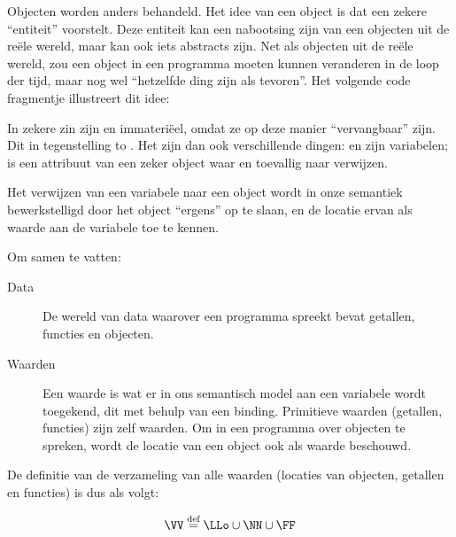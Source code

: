 Objecten worden anders behandeld. Het idee van een object is dat een zekere ``entiteit'' voorstelt. Deze entiteit kan een nabootsing zijn van een objecten uit de reële wereld, maar kan ook iets abstracts zijn. Net als objecten uit de reële wereld, zou een object in een programma moeten kunnen veranderen in de loop der tijd, maar nog wel ``hetzelfde ding zijn als tevoren''. Het volgende code fragmentje illustreert dit idee:

\begin{NoBreak}
  \codeFragmentCaption
\end{NoBreak}

In zekere zin zijn  en  immateriëel, omdat ze op deze manier ``vervangbaar'' zijn. Dit in tegenstelling to . Het zijn dan ook verschillende dingen:  en  zijn variabelen;  is een attribuut van een zeker object waar  en  toevallig naar verwijzen.

Het verwijzen van een variabele naar een object wordt in onze semantiek bewerkstelligd door het object ``ergens'' op te slaan, en de locatie ervan als waarde aan de variabele toe te kennen.

Om samen te vatten:

\begin{description}
  \item[Data] De wereld van data waarover een programma spreekt bevat getallen, functies en objecten.
  \item[Waarden] Een waarde is wat er in ons semantisch model aan een variabele wordt toegekend, dit met behulp van een binding. Primitieve waarden (getallen, functies) zijn zelf waarden. Om in een programma over objecten te spreken, wordt de locatie van een object ook als waarde beschouwd.
\end{description}

De definitie van de verzameling van alle waarden (locaties van objecten, getallen en functies) is dus als volgt:

\begin{equation*}
  \VV \DEF \LLo \cup \NN \cup \FF
\end{equation*}

